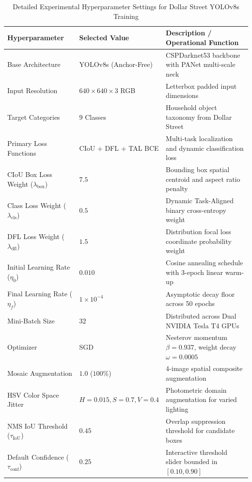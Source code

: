 \begin{table}[htbp]
    \centering
    \caption{Detailed Experimental Hyperparameter Settings for Dollar Street YOLOv8s Training}
    \label{tab:hyperparameters}
    \begin{tabularx}{\textwidth}{l l X}
        \toprule
        \textbf{Hyperparameter} & \textbf{Selected Value} & \textbf{Description / Operational Function} \\
        \midrule
        Base Architecture       & YOLOv8s (Anchor-Free)   & CSPDarknet53 backbone with PANet multi-scale neck \\
        Input Resolution        & $640 \times 640 \times 3$ RGB & Letterbox padded input dimensions \\
        Target Categories       & $9$ Classes             & Household object taxonomy from Dollar Street \\
        Primary Loss Functions  & CIoU + DFL + TAL BCE    & Multi-task localization and dynamic classification loss \\
        CIoU Box Loss Weight ($\lambda_{\text{box}}$) & $7.5$ & Bounding box spatial centroid and aspect ratio penalty \\
        Class Loss Weight ($\lambda_{\text{cls}}$)    & $0.5$ & Dynamic Task-Aligned binary cross-entropy weight \\
        DFL Loss Weight ($\lambda_{\text{dfl}}$)      & $1.5$ & Distribution focal loss coordinate probability weight \\
        Initial Learning Rate ($\eta_0$)              & $0.010$ & Cosine annealing schedule with 3-epoch linear warm-up \\
        Final Learning Rate ($\eta_f$)                & $1 \times 10^{-4}$ & Asymptotic decay floor across 50 epochs \\
        Mini-Batch Size         & $32$                    & Distributed across Dual NVIDIA Tesla T4 GPUs \\
        Optimizer               & SGD                     & Nesterov momentum $\beta = 0.937$, weight decay $\omega = 0.0005$ \\
        Mosaic Augmentation     & $1.0$ ($100\%$)         & 4-image spatial composite augmentation \\
        HSV Color Space Jitter  & $H=0.015, S=0.7, V=0.4$ & Photometric domain augmentation for varied lighting \\
        NMS IoU Threshold ($\tau_{\text{IoU}}$) & $0.45$ & Overlap suppression threshold for candidate boxes \\
        Default Confidence ($\tau_{\text{conf}}$) & $0.25$ & Interactive threshold slider bounded in $[0.10, 0.90]$ \\
        \bottomrule
    \end{tabularx}
\end{table}
